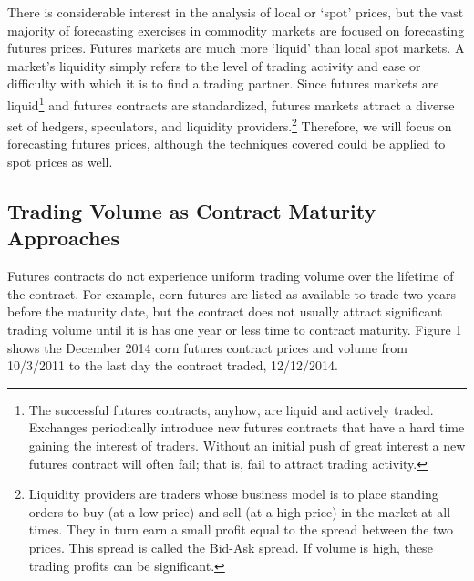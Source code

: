 \documentclass[]{book}
\let\rmarkdownfootnote\footnote%
\def\footnote{\protect\rmarkdownfootnote}
\theoremstyle{definition}
\theoremstyle{definition}
\theoremstyle{remark}
\begin{document}
There is considerable interest in the analysis of local or `spot'
prices, but the vast majority of forecasting exercises in commodity
markets are focused on forecasting futures prices. Futures markets are
much more `liquid' than local spot markets. A market's liquidity simply
refers to the level of trading activity and ease or difficulty with
which it is to find a trading partner. Since futures markets are
liquid\footnote{The successful futures contracts, anyhow, are liquid and
  actively traded. Exchanges periodically introduce new futures
  contracts that have a hard time gaining the interest of traders.
  Without an initial push of great interest a new futures contract will
  often fail; that is, fail to attract trading activity.} and futures
contracts are standardized, futures markets attract a diverse set of
hedgers, speculators, and liquidity providers.\footnote{Liquidity
  providers are traders whose business model is to place standing orders
  to buy (at a low price) and sell (at a high price) in the market at
  all times. They in turn earn a small profit equal to the spread
  between the two prices. This spread is called the Bid-Ask spread. If
  volume is high, these trading profits can be significant.} Therefore,
we will focus on forecasting futures prices, although the techniques
covered could be applied to spot prices as well.

\subsection{Trading Volume as Contract Maturity
Approaches}\label{trading-volume-as-contract-maturity-approaches}

Futures contracts do not experience uniform trading volume over the
lifetime of the contract. For example, corn futures are listed as
available to trade two years before the maturity date, but the contract
does not usually attract significant trading volume until it is has one
year or less time to contract maturity. Figure 1 shows the December 2014
corn futures contract prices and volume from 10/3/2011 to the last day
the contract traded, 12/12/2014.
\end{document}
